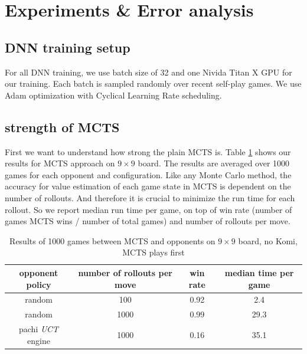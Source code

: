 \documentclass{article}
\begin{document}
\section{Experiments \& Error analysis}
\subsection{DNN training setup}
For all DNN training, we use batch size of 32 and one Nivida Titan X GPU for our training. Each batch is sampled randomly over recent self-play games.  We use Adam \cite{kingma2014adam} optimization with Cyclical Learning Rate scheduling\cite{smith2017cyclical}.

\subsection{strength of MCTS}

First we want to understand how strong the plain MCTS is.  Table \ref{tbl:mcts} shows our results for MCTS approach on $9 \times 9$ board. The results are averaged over 1000 games for each opponent and configuration.  
Like any Monte Carlo method, the accuracy for value estimation of each game state in MCTS is dependent on the number of rollouts. And therefore it is crucial to minimize the run time for each rollout. So we report median run time per game, on top of win rate (number of games MCTS wins / number of total games) and number of rollouts per move. 

\begin{table}[ht]
  \caption{Results of 1000 games between MCTS and opponents on $9 \times 9$ board, no Komi, MCTS plays first}
  \label{tbl:mcts}
  \centering
  \begin{tabular}{c | c | c | c}
    opponent policy    &  number of rollouts per move & win rate  & median time per game \\
    \hline
    random            &  100 &  0.92  & 2.4 \\
    random            &  1000 &  0.99  & 29.3 \\
    pachi \textit{UCT} engine  &  1000 &  0.16  & 35.1 \\
  \end{tabular}
\end{table}
\end{document}
